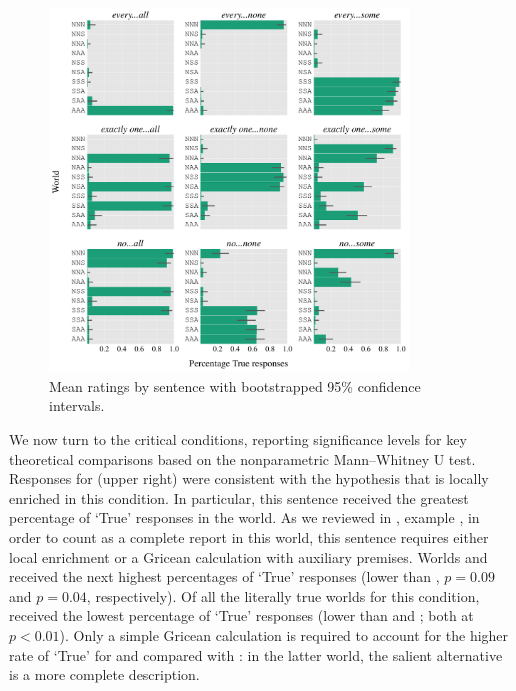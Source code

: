 \documentclass[leqno,12pt]{article}
\begin{document}
\begin{figure}[!ht]
  \centering
  \includegraphics[width=0.85\textwidth]{fig/basketball-binary-version-pilot-4-1-15-results-parsed}
  \caption{Mean ratings by sentence with bootstrapped 95\% confidence intervals.}
  \label{fig:binary:results}
\end{figure}


We now turn to the critical conditions, reporting significance levels
for key theoretical comparisons based on the nonparametric
Mann--Whitney U test. Responses for  (upper right)
were consistent with the hypothesis that  is locally
enriched in this condition. In particular, this sentence received the
greatest percentage of `True' responses in the  world. As
we reviewed in , example ,
in order to count as a complete report in this world, this sentence
requires either local enrichment or a Gricean calculation with
auxiliary premises. Worlds  and  received the
next highest percentages of `True' responses (lower than ,
$p = 0.09$ and $p = 0.04$, respectively). Of all the literally true
worlds for this condition,  received the lowest percentage
of `True' responses (lower than  and ; both at
$p < 0.01$).  Only a simple Gricean calculation is required to account
for the higher rate of `True' for  and  compared
with : in the latter world, the salient alternative
 is a more complete
description.
\end{document}
